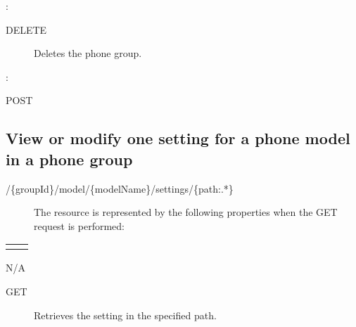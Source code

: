 \documentclass[letterpaper,10pt,english]{sphinxmanual}
\begin{document}
:

\begin{sphinxVerbatim}[commandchars=\\\{\}]
\end{sphinxVerbatim}
\begin{description}
\item[{ DELETE}] \leavevmode
Deletes the phone group.

\end{description}

:

\begin{sphinxVerbatim}[commandchars=\\\{\}]
\end{sphinxVerbatim}

 POST


\subsection{View or modify one setting for a phone model in a phone group}
\label{\detokenize{restapi:view-or-modify-one-setting-for-a-phone-model-in-a-phone-group}}
 /\{groupId\}/model/\{modelName\}/settings/\{path:.*\}
\begin{description}
\item[{}] \leavevmode
The resource is represented by the following properties when the GET request is performed:

\end{description}


\begin{savenotes}\sphinxattablestart
\centering
\begin{tabulary}{\linewidth}[t]{|T|T|}
\hline

&
\\
\hline&\\
\hline
\end{tabulary}
\par
\sphinxattableend\end{savenotes}

 N/A
\begin{description}
\item[{ GET}] \leavevmode
Retrieves the setting in the specified path.

\end{description}
\end{document}
